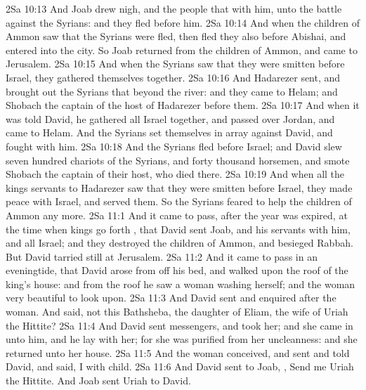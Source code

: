 \vs 2Sa 10:13 And Joab drew nigh, and the people that  with him, unto the battle against the Syrians: and they fled before him.
\vs 2Sa 10:14 And when the children of Ammon saw that the Syrians were fled, then fled they also before Abishai, and entered into the city. So Joab returned from the children of Ammon, and came to Jerusalem.
\vs 2Sa 10:15 And when the Syrians saw that they were smitten before Israel, they gathered themselves together.
\vs 2Sa 10:16 And Hadarezer sent, and brought out the Syrians that  beyond the river: and they came to Helam; and Shobach the captain of the host of Hadarezer  before them.
\vs 2Sa 10:17 And when it was told David, he gathered all Israel together, and passed over Jordan, and came to Helam. And the Syrians set themselves in array against David, and fought with him.
\vs 2Sa 10:18 And the Syrians fled before Israel; and David slew  seven hundred chariots of the Syrians, and forty thousand horsemen, and smote Shobach the captain of their host, who died there.
\vs 2Sa 10:19 And when all the kings  servants to Hadarezer saw that they were smitten before Israel, they made peace with Israel, and served them. So the Syrians feared to help the children of Ammon any more.
\vs 2Sa 11:1 And it came to pass, after the year was expired, at the time when kings go forth , that David sent Joab, and his servants with him, and all Israel; and they destroyed the children of Ammon, and besieged Rabbah. But David tarried still at Jerusalem.
\vs 2Sa 11:2 And it came to pass in an eveningtide, that David arose from off his bed, and walked upon the roof of the king's house: and from the roof he saw a woman washing herself; and the woman  very beautiful to look upon.
\vs 2Sa 11:3 And David sent and enquired after the woman. And  said,  not this Bathsheba, the daughter of Eliam, the wife of Uriah the Hittite?
\vs 2Sa 11:4 And David sent messengers, and took her; and she came in unto him, and he lay with her; for she was purified from her uncleanness: and she returned unto her house.
\vs 2Sa 11:5 And the woman conceived, and sent and told David, and said, I  with child.
\vs 2Sa 11:6 And David sent to Joab, , Send me Uriah the Hittite. And Joab sent Uriah to David.
